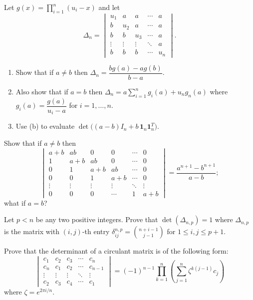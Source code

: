 \documentclass[12pt]{article}
\begin{document}
\begin{problems}
\item Let $g(x)=\prod_{i=1}^n (u_i-x)$ and let
\[
\Delta_n = \begin{vmatrix}
u_1 & a & a & \cdots & a\\
b & u_2 & a & \cdots & a\\
b & b & u_3 & \cdots & a\\
\vdots & \vdots & \vdots & \ddots & a\\
b & b & b & \cdots & u_n
\end{vmatrix}.
\]
\begin{enumerate}[label=(\alph*)]
\item Show that if $a\ne b$ then $\Delta_n = \dfrac{bg(a)-ag(b)}{b-a}$.
\item Also show that if $a=b$ then $\Delta_n = a\sum_{i=1}^n g_i(a) + u_ng_n(a)$ where $g_i(a) = \dfrac{g(a)}{u_i-a}$ for $i=1,\dots,n$.
\item Use (b) to evaluate $\det\big((a-b)I_n + b\,\mathbf 1_n\mathbf 1_n^T\big)$.
\end{enumerate}

\item Show that if $a\ne b$ then
\[
\begin{vmatrix}
a+b & ab & 0 & 0 & \cdots & 0\\
1 & a+b & ab & 0 & \cdots & 0\\
0 & 1 & a+b & ab & \cdots & 0\\
0 & 0 & 1 & a+b & \cdots & 0\\
\vdots & \vdots & \vdots & \vdots & \ddots & \vdots\\
0 & 0 & 0 & \cdots & 1 & a+b
\end{vmatrix} = \frac{a^{n+1}-b^{n+1}}{a-b};
\]
what if $a=b$?

\item Let $p<n$ be any two positive integers. Prove that $\det(\Delta_{n,p})=1$ where $\Delta_{n,p}$ is the matrix with $(i,j)$-th entry $\delta_{ij}^{n,p} = \binom{n+i-1}{j-1}$ for $1\le i,j\le p+1$.

\item Prove that the determinant of a circulant matrix is of the following form:
\[
\begin{vmatrix}
c_1 & c_2 & c_3 & \cdots & c_n\\
c_n & c_1 & c_2 & \cdots & c_{n-1}\\
\vdots & \vdots & \vdots & \ddots & \vdots\\
c_2 & c_3 & c_4 & \cdots & c_1
\end{vmatrix} = (-1)^{n-1}\prod_{k=1}^n \left(\sum_{j=1}^n \zeta^{k(j-1)}c_j\right)
\]
where $\zeta = e^{2\pi i/n}$.


\end{problems}
\end{document}
